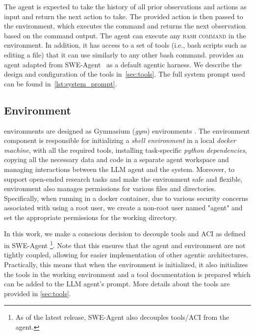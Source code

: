 The agent is expected to take the history of all prior observations and actions as input and return the next action to take. The provided action is then passed to the environment, which executes the command and returns the next observation based on the command output.
%
The agent can execute any \textsc{bash command} in the environment. In addition, it has access to a set of tools (i.e., bash scripts such as editing a file) that it can use similarly to any other bash command.
\mlgym provides an agent adapted from SWE-Agent~\citep{yangSWEagentAgentComputerInterfaces2024} as a default agentic harness.
We describe the design and configuration of the tools in~\autoref{sec:tools}. The full system prompt used can be found in~\autoref{lst:system_prompt}.

\subsection{Environment}
\label{sec:environment}
\mlgym environments are designed as Gymnasium (\textit{gym}) environments \citep{towers2024gymnasiumstandardinterfacereinforcement}.
%
The environment component is responsible for initializing a \textit{shell environment} in a local \textit{docker machine}, with all the required tools, installing task-specific \textit{python dependencies}, copying all the necessary data and code in a separate agent workspace and managing interactions between the LLM agent and the system.
%
Moreover, to support open-ended research tasks and make the environment safe and flexible, \mlgym environment also manages permissions for various files and directories.
%
Specifically, when running in a docker container, due to various security concerns associated with using a root user, we create a non-root user named "agent" and set the appropriate permissions for the working directory.

In this work, we make a conscious decision to decouple tools and ACI as defined in SWE-Agent \citep{yangSWEagentAgentComputerInterfaces2024}\footnote{As of the latest release, SWE-Agent also decouples tools/ACI from the agent.}.
%
Note that this ensures that the agent and environment are not tightly coupled, allowing for easier implementation of other agentic architectures.
%
Practically, this means that when the environment is initialized, it also initializes the tools in the working environment and a tool documentation is prepared which can be added to the LLM agent's prompt. More details about the tools are provided in \autoref{sec:tools}.

